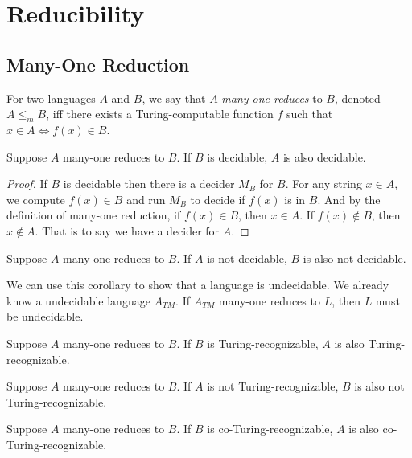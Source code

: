 \documentclass[11pt]{article}
\begin{document}
\section{Reducibility}

\subsection{Many-One Reduction}

\begin{definition}
For two languages $A$ and $B$, we say that $A$ \emph{many-one reduces} to $B$, denoted
$A \leq_m B$, iff there exists a Turing-computable function $f$ such that
$x \in A \Leftrightarrow f(x) \in B$.
\end{definition}

\begin{proposition}
Suppose $A$ many-one reduces to $B$. If $B$ is decidable, $A$ is also decidable.
\end{proposition}

\begin{proof}
If $B$ is decidable then there is a decider $M_B$ for $B$. For any string $x \in A$, we compute
$f(x) \in B$ and run $M_B$ to decide if $f(x)$ is in $B$. And by the definition of many-one
reduction, if $f(x) \in B$, then $x \in A$. If $f(x) \not\in B$, then $x \not\in A$. That is to say
we have a decider for $A$.
\end{proof}

\begin{corollary}
Suppose $A$ many-one reduces to $B$. If $A$ is not decidable, $B$ is also not decidable.
\end{corollary}

We can use this corollary to show that a language is undecidable. We already know a undecidable
language $A_{TM}$. If $A_{TM}$ many-one reduces to $L$, then $L$ must be undecidable.

\begin{corollary}
Suppose $A$ many-one reduces to $B$. If $B$ is Turing-recognizable, $A$ is also Turing-recognizable.
\end{corollary}

\begin{corollary}
Suppose $A$ many-one reduces to $B$. If $A$ is not Turing-recognizable, $B$ is also not
Turing-recognizable.
\end{corollary}

\begin{corollary}
Suppose $A$ many-one reduces to $B$. If $B$ is co-Turing-recognizable, $A$ is also
co-Turing-recognizable.
\end{corollary}
\end{document}
